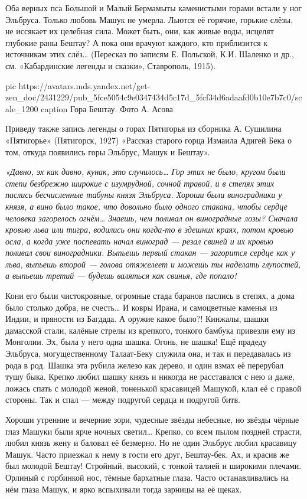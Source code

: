 Оба верных пса Большой и Малый Бермамыты каменистыми горами встали у ног
Эльбруса. Только любовь Машук не умерла. Льются её горячие, горькие слёзы, не
иссякает их целебная сила. Может быть, они, как живые воды, исцелят глубокие
раны Бештау? А пока они врачуют каждого, кто приблизится к источникам этих
слёз… (Пересказ по записям Е. Польской, К.И. Шаленко и др., см. «Кабардинские
легенды и сказки», Ставрополь, 1915).


\ifcmt
  pic https://avatars.mds.yandex.net/get-zen_doc/2431229/pub_5fce5054c9e0347434d5c17d_5fcf34d6adaafd0b10e7b7c0/scale_1200
	caption Гора Бештау. Фото А. Асова
\fi

Приведу также запись легенды о горах Пятигорья из сборника А. Сушилина
«Пятигорье» (Пятигорск, 1927) «Рассказ старого горца Измаила Адигей Бека о том,
откуда появились горы Эльбрус, Машук и Бештау».

\begingroup
	\em\large\color{blue}
«Давно, эх как давно, кунак, это случилось… Гор этих не было, кругом были
степи безбрежно широкие с изумрудной, сочной травой, и в степях этих
паслись бесчисленные табуны князя Эльбруса. Хороши были виноградники у
князя, а вино было такое, что довольно было одного стакана, чтобы сердце
человека загорелось огнём… Знаешь, чем поливал он виноградные лозы? Сначала
кровью льва или тигра, водились они когда-то в здешних краях, потом кровью
осла, а когда уже поспевать начал виноград — резал свиней и их кровью
поливал свои виноградники. Выпьешь первый стакан — загорится сердце как у
льва, выпьешь второй — голова отяжелеет и можешь ты наделать глупостей, а
выпьешь третий — будешь валяться как свинья, где попало!

Кони его были чистокровные, огромные стада баранов паслись в степях, а дома
было столько добра, не счесть… И ковры Ирана, и самоцветные каменья из
Индии, и пряности из Багдада. А оружие какое было?! Кинжалы, шашки
дамасской стали, калёные стрелы из крепкого, тонкого бамбука привезли ему
из Монголии. Эх, была у него одна шашка. Огонь, не шашка! Ещё прадеду
Эльбруса, могущественному Талаат-Беку служила она, и так и передавалась из
рода в род. Шашка эта рубила железо как дерево, и один взмах её перерубал
тушу быка. Крепко любил шашку князь и никогда не расставался с нею и даже,
ложась спать с молодой женой, тоненькой красавицей Машукой, клал её с
правой стороны. Так и спал — между подругой сердца и подругой битв.

Хороши утренние и вечерние зори, чудесные звёзды небесные, но звёзды чёрные
глаз Машуки были ярче ночных светил… Крепко, со всем пылом поздней страсти,
любил князь жену и баловал её безмерно. Но не один Эльбрус любил красавицу
Машук. Часто приезжал к нему в гости его друг, Бештау-бек. Ах, и красив же
был молодой Бештау! Стройный, высокий, с тонкой талией и широкими плечами.
Орлиный с горбинкой нос, тёмные бархатные глаза. Часто останавливались на
нём глаза Машук, и ярко вспыхивали тогда зарницы на её щеках.

